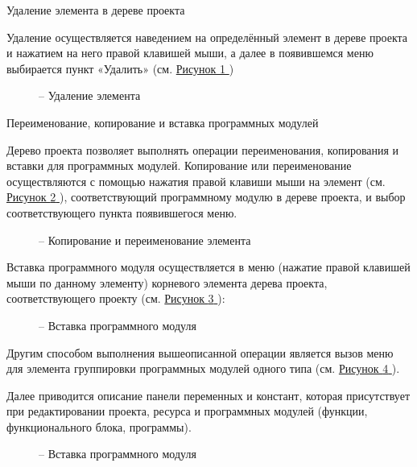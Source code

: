 \documentclass[letterpaper,10pt,russian]{sphinxmanual}
\begin{document}
Удаление элемента в дереве проекта

Удаление осуществляется наведением на определённый элемент в дереве
проекта и нажатием на него правой клавишей мыши, а далее в появившемся
меню выбирается пункт «Удалить» (см. \hyperref[usage_guide/ide_components:image29]{Рисунок \ref{usage_guide/ide_components:image29} })
\begin{figure}[htbp]
\centering
\capstart

\noindent{}
\caption{– Удаление элемента}\label{usage_guide/ide_components:image29}\end{figure}

Переименование, копирование и вставка программных модулей

Дерево проекта позволяет выполнять операции переименования, копирования
и вставки для программных модулей. Копирование или переименование
осуществляются с помощью нажатия правой клавиши мыши на элемент (см.
\hyperref[usage_guide/ide_components:img29]{Рисунок \ref{usage_guide/ide_components:img29} }), соответствующий программному модулю в дереве проекта, и выбор
соответствующего пункта появившегося меню.
\begin{figure}[htbp]
\centering
\capstart

\noindent{}
\caption{– Копирование и переименование элемента}\label{usage_guide/ide_components:img29}\end{figure}

Вставка программного модуля осуществляется в меню (нажатие правой
клавишей мыши по данному элементу) корневого элемента дерева проекта,
соответствующего проекту (см. \hyperref[usage_guide/ide_components:image30]{Рисунок \ref{usage_guide/ide_components:image30} }):
\begin{figure}[htbp]
\centering
\capstart

\noindent{}
\caption{– Вставка программного модуля}\label{usage_guide/ide_components:image30}\end{figure}

Другим способом выполнения вышеописанной операции является вызов меню
для элемента группировки программных модулей одного типа (см. \hyperref[usage_guide/ide_components:image31]{Рисунок \ref{usage_guide/ide_components:image31} }).

Далее приводится описание панели переменных и констант, которая
присутствует при редактировании проекта, ресурса и программных модулей
(функции, функционального блока, программы).
\begin{figure}[htbp]
\centering
\capstart

\noindent{}
\caption{– Вставка программного модуля}\label{usage_guide/ide_components:image31}\end{figure}
\end{document}
